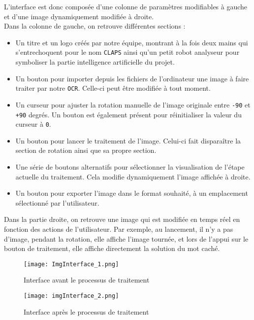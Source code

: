 \documentclass{article}
\begin{document}
L'interface est donc composée d'une colonne de paramètres modifiables à gauche et d'une image dynamiquement modifiée à droite.\\

Dans la colonne de gauche, on retrouve différentes sections :
\begin{itemize}
    \item Un titre et un logo créés par notre équipe, montrant à la fois deux mains qui s'entrechoquent pour le nom \texttt{CLAPS} ainsi qu'un petit robot analyseur pour symboliser la partie intelligence artificielle du projet.
    \item Un bouton pour importer depuis les fichiers de l'ordinateur une image à faire traiter par notre \texttt{OCR}. Celle-ci peut être modifiée à tout moment.
    \item Un curseur pour ajuster la rotation manuelle de l'image originale entre \texttt{-90} et \texttt{+90} degrés. Un bouton est également présent pour réinitialiser la valeur du curseur à \texttt{0}.
    \item Un bouton pour lancer le traitement de l'image. Celui-ci fait disparaître la section de rotation ainsi que sa propre section.
    \item Une série de boutons alternatifs pour sélectionner la visualisation de l'étape actuelle du traitement. Cela modifie dynamiquement l'image affichée à droite.
    \item Un bouton pour exporter l'image dans le format souhaité, à un emplacement sélectionné par l'utilisateur.\\
\end{itemize}

Dans la partie droite, on retrouve une image qui est modifiée en temps réel en fonction des actions de l'utilisateur. Par exemple, au lancement, il n'y a pas d'image, pendant la rotation, elle affiche l'image tournée, et lors de l'appui sur le bouton de traitement, elle affiche directement la solution du mot caché.\\

\begin{figure}[H]
    \centering
    \texttt{[image: ImgInterface\_1.png]}
    \caption{Interface avant le processus de traitement}
\end{figure}

\begin{figure}[H]
    \centering
    \texttt{[image: imgInterface\_2.png]}
    \caption{Interface après le processus de traitement}
\end{figure}
\end{document}
